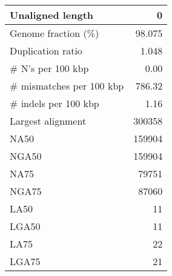 \documentclass[12pt,a4paper]{article}
\begin{document}
\begin{table}[ht]
\begin{center}
\begin{tabular}{|l*{1}{|r}|}
Unaligned length & 0 \\ \hline
Genome fraction (\%) & 98.075 \\ \hline
Duplication ratio & 1.048 \\ \hline
\# N's per 100 kbp & 0.00 \\ \hline
\# mismatches per 100 kbp & 786.32 \\ \hline
\# indels per 100 kbp & 1.16 \\ \hline
Largest alignment & 300358 \\ \hline
NA50 & 159904 \\ \hline
NGA50 & 159904 \\ \hline
NA75 & 79751 \\ \hline
NGA75 & 87060 \\ \hline
LA50 & 11 \\ \hline
LGA50 & 11 \\ \hline
LA75 & 22 \\ \hline
LGA75 & 21 \\ \hline
\end{tabular}
\end{center}
\end{table}
\end{document}
